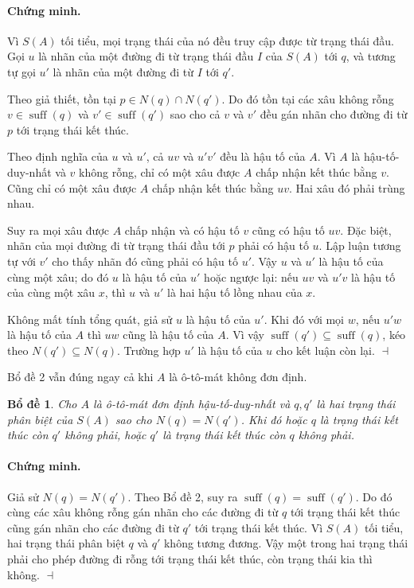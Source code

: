 \documentclass[11pt]{article}
\newtheorem{lemma}{Bổ đề}
\newenvironment{proof}{\paragraph{Chứng minh.}}{\hfill$\dashv$\par}
\newcommand{\suff}{\operatorname{suff}}
\begin{document}
\begin{proof}
Vì $S(A)$ tối tiểu, mọi trạng thái của nó đều truy cập được từ trạng thái đầu.
Gọi $u$ là nhãn của một đường đi từ trạng thái đầu $I$ của $S(A)$ tới $q$, và
tương tự gọi $u'$ là nhãn của một đường đi từ $I$ tới $q'$.

Theo giả thiết, tồn tại $p\in N(q)\cap N(q')$. Do đó tồn tại các xâu không
rỗng $v\in\suff(q)$ và $v'\in\suff(q')$ sao cho cả $v$ và $v'$ đều gán nhãn
cho đường đi từ $p$ tới trạng thái kết thúc.

Theo định nghĩa của $u$ và $u'$, cả $uv$ và $u'v'$ đều là hậu tố của $A$. Vì
$A$ là hậu-tố-duy-nhất và $v$ không rỗng, chỉ có một xâu được $A$ chấp nhận
kết thúc bằng $v$. Cũng chỉ có một xâu được $A$ chấp nhận kết thúc bằng $uv$.
Hai xâu đó phải trùng nhau.

Suy ra mọi xâu được $A$ chấp nhận và có hậu tố $v$ cũng có hậu tố $uv$. Đặc
biệt, nhãn của mọi đường đi từ trạng thái đầu tới $p$ phải có hậu tố $u$. Lập
luận tương tự với $v'$ cho thấy nhãn đó cũng phải có hậu tố $u'$. Vậy $u$ và
$u'$ là hậu tố của cùng một xâu; do đó $u$ là hậu tố của $u'$ hoặc ngược lại:
nếu $uv$ và $u'v$ là hậu tố của cùng một xâu $x$, thì $u$ và $u'$ là hai hậu
tố lồng nhau của $x$.

Không mất tính tổng quát, giả sử $u$ là hậu tố của $u'$. Khi đó với mọi $w$,
nếu $u'w$ là hậu tố của $A$ thì $uw$ cũng là hậu tố của $A$. Vì vậy
$\suff(q')\subseteq\suff(q)$, kéo theo $N(q')\subseteq N(q)$. Trường hợp
$u'$ là hậu tố của $u$ cho kết luận còn lại.
\end{proof}

Bổ đề 2 vẫn đúng ngay cả khi $A$ là ô-tô-mát không đơn định.

\begin{lemma}
Cho $A$ là ô-tô-mát đơn định hậu-tố-duy-nhất và $q,q'$ là hai trạng thái phân
biệt của $S(A)$ sao cho $N(q)=N(q')$. Khi đó hoặc $q$ là trạng thái kết thúc
còn $q'$ không phải, hoặc $q'$ là trạng thái kết thúc còn $q$ không phải.
\end{lemma}

\begin{proof}
Giả sử $N(q)=N(q')$. Theo Bổ đề 2, suy ra $\suff(q)=\suff(q')$. Do đó cùng các
xâu không rỗng gán nhãn cho các đường đi từ $q$ tới trạng thái kết thúc cũng
gán nhãn cho các đường đi từ $q'$ tới trạng thái kết thúc. Vì $S(A)$ tối tiểu,
hai trạng thái phân biệt $q$ và $q'$ không tương đương. Vậy một trong hai trạng
thái phải cho phép đường đi rỗng tới trạng thái kết thúc, còn trạng thái kia
thì không.
\end{proof}
\end{document}
